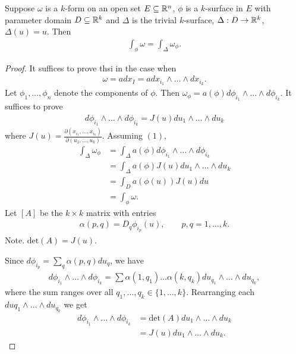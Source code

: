 \documentclass[11pt]{article}
\begin{document}
\begin{theorem} Suppose $\omega$ is a $k$-form on an open set $E \subseteq \mathbb{R}^n$, $\phi$ is a $k$-surface in $E$ with parameter domain $D \subseteq \mathbb{R}^k$ and $\Delta$ is the trivial $k$-surface, $\Delta : D \to \mathbb{R}^k$, $\Delta(u) = u$. Then \begin{align*} \int_{\phi} \omega = \int_{\Delta} \omega_{\phi}.
\end{align*}
\end{theorem}
\begin{proof} It suffices to prove thsi in the case when \begin{align*} \omega = a dx_I = adx_{i_1} \wedge \dots \wedge dx_{i_k}.
\end{align*} Let $\phi_1, \dots, \phi_n$ denote the components of $\phi$. Then $\omega_{\phi} = a(\phi)d\phi_{i_1} \wedge \dots \wedge d \phi_{i_k}$. It suffices to prove \begin{align*} d \phi_{i_1} \wedge \dots \wedge d \phi_{i_k} = J(u) du_1 \wedge \dots \wedge du_k \tag{1}
\end{align*} where $J(u) = \frac{\partial (x_{i_1}, \dots, x_{i_k})}{\partial(u_1, \dots, u_k)}$. Assuming $(1)$, \begin{align*} \int_{\Delta} \omega_{\phi} & = \int_{\Delta} a(\phi) d\phi_{i_1} \wedge \dots \wedge d \phi_{i_k} \\ & = \int_{\Delta} a (\phi) J(u) du_1 \wedge \dots \wedge du_k \\ & = \int_D a(\phi(u)) J(u) du \\ & = \int_{\phi} \omega.
\end{align*} Let $[A]$ be the $k \times k$ matrix with entries \begin{align*} \alpha (p, q) = D_q \phi_{i_p}(u), \qquad p, q = 1, \dots, k.
\end{align*} Note. $\mathrm{det}(A) = J(u)$.

Since $d \phi_{i_p} = \sum_q \alpha(p, q) du_q$, we have \begin{align*} d \phi_{i_1} \wedge \dots \wedge d \phi_{i_k} = \sum \alpha(1, q_1) \dots \alpha (k, q_k) du_{q_1} \wedge \dots \wedge du_{q_k},
\end{align*} where the sum ranges over all $q_1, \dots, q_k \in \{ 1, \dots, k \}$. Rearranging each $duq_1 \wedge \dots \wedge du_{q_k}$ we get \begin{align*} d \phi_{i_1} \wedge \dots \wedge d\phi_{i_k} & = \mathrm{det}(A) du_1 \wedge \dots \wedge du_k \\ & = J(u) du_1 \wedge \dots \wedge du_k.
\end{align*}
\end{proof}
\end{document}
